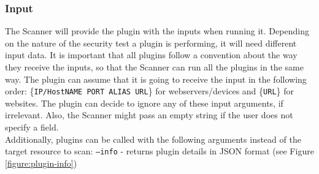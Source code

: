 \subsubsection{Input}
The Scanner will provide the plugin with the inputs when running it. Depending on the nature of the security test a plugin is performing, it will need different input data. It is important that all plugins follow a convention about the way they receive the inputs, so that the Scanner can run all the plugins in the same way. The plugin can assume that it is going to receive the input in the following order: \{\texttt{IP/HostNAME PORT ALIAS URL}\} for webservers/devices and \{\texttt{URL}\} for websites. The plugin can decide to ignore any of these input arguments, if irrelevant. Also, the Scanner might pass an empty string if the user does not specify a field.
\\
Additionally, plugins can be called with the following arguments instead of the target resource to scan:
\texttt{--info} - returns plugin details in JSON format (see Figure \ref{figure:plugin-info})  
